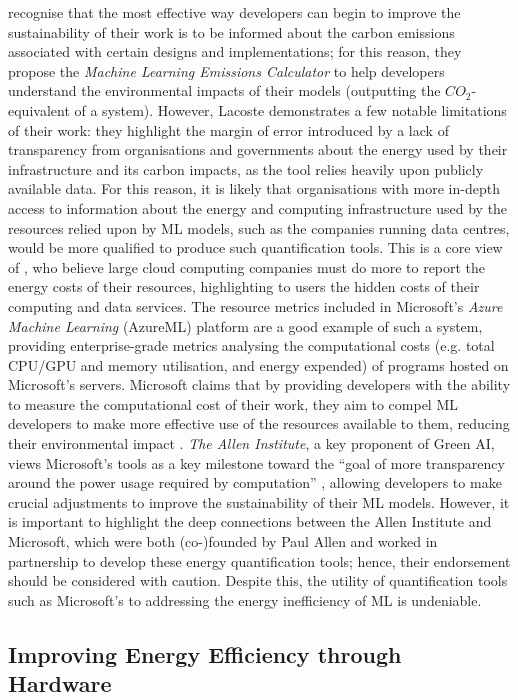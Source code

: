 \documentclass[a4paper, 12pt]{article}
\begin{document}
    \citet{lacoste-2019} recognise that the most effective way developers can begin to improve the sustainability of their work is to be informed about the carbon emissions associated with certain designs and implementations; for this reason, they propose the \emph{Machine Learning Emissions Calculator} to help developers understand the environmental impacts of their models (outputting the $CO_2$-equivalent of a system). However, Lacoste demonstrates a few notable limitations of their work: they highlight the margin of error introduced by a lack of transparency from organisations and governments about the energy used by their infrastructure and its carbon impacts, as the tool relies heavily upon publicly available data. For this reason, it is likely that organisations with more in-depth access to information about the energy and computing infrastructure used by the resources relied upon by ML models, such as the companies running data centres, would be more qualified to produce such quantification tools. This is a core view of \citet{dodge-2019}, who believe large cloud computing companies must do more to report the energy costs of their resources, highlighting to users the hidden costs of their computing and data services. The resource metrics included in Microsoft's \emph{Azure Machine Learning} (AzureML) platform are a good example of such a system, providing enterprise-grade metrics analysing the computational costs (e.g. total CPU/GPU and memory utilisation, and energy expended) of programs hosted on Microsoft's servers. Microsoft claims that by providing developers with the ability to measure the computational cost of their work, they aim to compel ML developers to make more effective use of the resources available to them, reducing their environmental impact \citep{buchanan-2021}. \emph{The Allen Institute}, a key proponent of Green AI, views Microsoft's tools as a key milestone toward the ``goal of more transparency around the power usage required by computation” \citep{dodge-2019}, allowing developers to make crucial adjustments to improve the sustainability of their ML models. However, it is important to highlight the deep connections between the Allen Institute and Microsoft, which were both (co-)founded by Paul Allen and worked in partnership to develop these energy quantification tools; hence, their endorsement should be considered with caution. Despite this, the utility of quantification tools such as Microsoft's to addressing the energy inefficiency of ML is undeniable.


    \subsection{Improving Energy Efficiency through Hardware}
\end{document}
